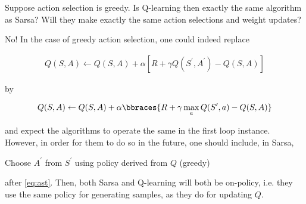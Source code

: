 
\begin{exercise}[Exercise 6.12]

Suppose action selection is greedy.
Is Q-learning then exactly the same algorithm as Sarsa?
Will they make exactly the same action selections and weight updates?

\end{exercise}


\begin{solution}

No!
In the case of greedy action selection, one could indeed replace

\begin{align*} \label{eq:ast} \tag{$\ast$}
	Q(S, A)
	\leftarrow
	Q(S, A) + \alpha [R + \gamma Q(S^\prime, A^\prime) - Q(S, A)]
\end{align*}

by

\begin{align*}
	Q(S, A)
	\leftarrow
	Q(S, A) + \alpha \bbraces{R + \gamma \max _a Q(S^\prime, a) - Q(S, A)}
\end{align*}

and expect the algorithms to operate the same in the first loop instance.
However, in order for them to do so in the future, one should include, in Sarsa,

\begin{displayquote}
	Choose $A^\prime$ from $S^\prime$ using policy derived from $Q$ (greedy)
\end{displayquote}

after \eqref{eq:ast}.
Then, both Sarsa and Q-learning will both be on-policy, i.e. they use the same policy for generating samples, as they do for updating $Q$.

\end{solution}


